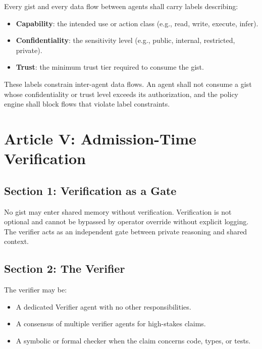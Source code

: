 \documentclass[12pt,letterpaper]{article}
\begin{document}
Every gist and every data flow between agents shall carry labels describing:

\begin{itemize}
    \item \textbf{Capability}: the intended use or action class (e.g., read, write, execute, infer).
    \item \textbf{Confidentiality}: the sensitivity level (e.g., public, internal, restricted, private).
    \item \textbf{Trust}: the minimum trust tier required to consume the gist.
\end{itemize}

These labels constrain inter-agent data flows. An agent shall not consume a gist whose confidentiality or trust level exceeds its authorization, and the policy engine shall block flows that violate label constraints.

\section{Article V: Admission-Time Verification}
\label{art:verification}

\subsection{Section 1: Verification as a Gate}

No gist may enter shared memory without verification. Verification is not optional and cannot be bypassed by operator override without explicit logging. The verifier acts as an independent gate between private reasoning and shared context.

\subsection{Section 2: The Verifier}

The verifier may be:

\begin{itemize}
    \item A dedicated Verifier agent with no other responsibilities.
    \item A consensus of multiple verifier agents for high-stakes claims.
    \item A symbolic or formal checker when the claim concerns code, types, or tests.
\end{itemize}
\end{document}
